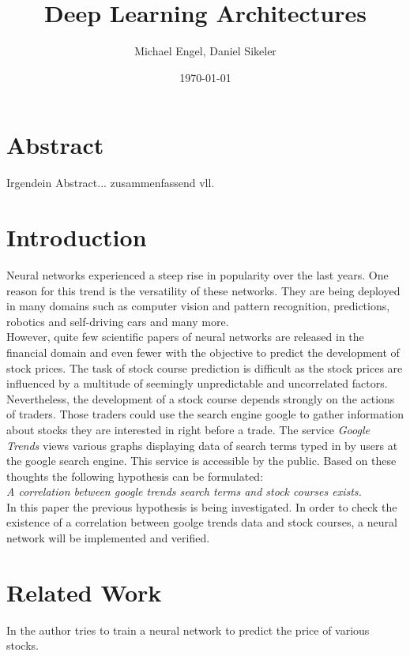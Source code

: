 \documentclass{IEEEtran}
\title{Deep Learning Architectures}
\author{Michael Engel, Daniel Sikeler}
\date{\today}
\begin{document}
\maketitle
\section{Abstract}
\label{sec:abstract}
Irgendein Abstract... zusammenfassend vll. 

\section{Introduction}
\label{sec:introduction}
Neural networks experienced a steep rise in popularity over the last years. One reason for this trend is the versatility of these networks. They are being deployed in many domains such as computer vision and pattern recognition, predictions, robotics and self-driving cars and many more. 
\\
However, quite few scientific papers of neural networks are released in the financial domain and even fewer with the objective to predict the development of stock prices. 
The task of stock course prediction is difficult as the stock prices are influenced by a multitude of seemingly unpredictable and uncorrelated factors. Nevertheless, the development of a stock course depends strongly on the actions of traders. Those traders could use the search engine google to gather information about stocks they are interested in right before a trade. The service \textit{Google Trends} views various graphs displaying data of search terms typed in by users at the google search engine. This service is accessible by the public. Based on these thoughts the following hypothesis can be formulated: \\
\textit{A correlation between google trends search terms and stock courses exists. } \\
In this paper the previous hypothesis is being investigated. In order to check the existence of a correlation between goolge trends data and stock courses, a neural network will be implemented and verified. 

\section{Related Work}
\label{sec:relatedwork}
In \cite{todo} the author tries to train a neural network to predict the price of various stocks. 
\end{document}
